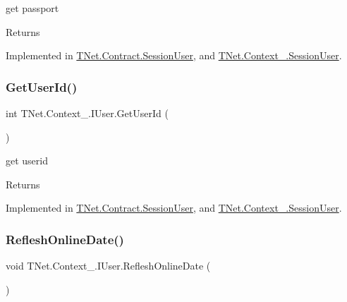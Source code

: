 get passport 

\begin{DoxyReturn}{Returns}

\end{DoxyReturn}


Implemented in \mbox{\hyperlink{class_t_net_1_1_contract_1_1_session_user_a22fcdffa10ecb3d862aea43e081199d0}{T\+Net.\+Contract.\+Session\+User}}, and \mbox{\hyperlink{class_t_net_1_1_context___1_1_session_user_a642e0124e4587a2c7d7961da76b13c97}{T\+Net.\+Context\+\_\+.\+Session\+User}}.

\mbox{\label{interface_t_net_1_1_context___1_1_i_user_a92f3fbefd7171a20797ea2115c1d3381}} 
\subsubsection{\texorpdfstring{Get\+User\+Id()}{GetUserId()}}
{\footnotesize\ttfamily int T\+Net.\+Context\+\_\+.\+I\+User.\+Get\+User\+Id (\begin{DoxyParamCaption}{ }\end{DoxyParamCaption})}



get userid 

\begin{DoxyReturn}{Returns}

\end{DoxyReturn}


Implemented in \mbox{\hyperlink{class_t_net_1_1_contract_1_1_session_user_a3874ee6c15b00ec73fc822a1733d1fc2}{T\+Net.\+Contract.\+Session\+User}}, and \mbox{\hyperlink{class_t_net_1_1_context___1_1_session_user_a044c8abf77ea4cce65a0cedd4d5efc7c}{T\+Net.\+Context\+\_\+.\+Session\+User}}.

\mbox{\label{interface_t_net_1_1_context___1_1_i_user_a7a87e43918c1415f2782cf201fb8228e}} 
\subsubsection{\texorpdfstring{Reflesh\+Online\+Date()}{RefleshOnlineDate()}}
{\footnotesize\ttfamily void T\+Net.\+Context\+\_\+.\+I\+User.\+Reflesh\+Online\+Date (\begin{DoxyParamCaption}{ }\end{DoxyParamCaption})}



